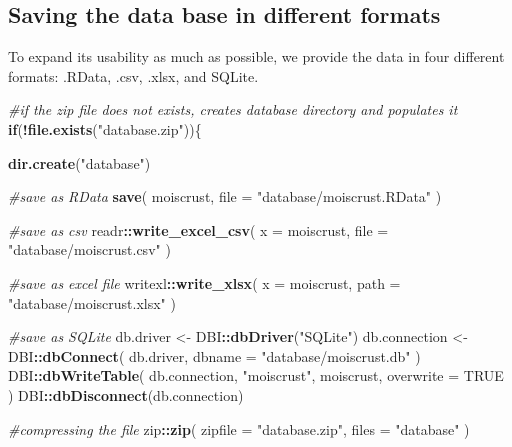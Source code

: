 \documentclass[]{article}
\newenvironment{Shaded}{\begin{snugshade}}{\end{snugshade}}
\newcommand{\CommentTok}[1]{\textcolor[rgb]{0.56,0.35,0.01}{\textit{#1}}}
\newcommand{\ControlFlowTok}[1]{\textcolor[rgb]{0.13,0.29,0.53}{\textbf{#1}}}
\newcommand{\DataTypeTok}[1]{\textcolor[rgb]{0.13,0.29,0.53}{#1}}
\newcommand{\KeywordTok}[1]{\textcolor[rgb]{0.13,0.29,0.53}{\textbf{#1}}}
\newcommand{\NormalTok}[1]{#1}
\newcommand{\OperatorTok}[1]{\textcolor[rgb]{0.81,0.36,0.00}{\textbf{#1}}}
\newcommand{\OtherTok}[1]{\textcolor[rgb]{0.56,0.35,0.01}{#1}}
\newcommand{\StringTok}[1]{\textcolor[rgb]{0.31,0.60,0.02}{#1}}
\begin{document}
\hypertarget{saving-the-data-base-in-different-formats}{%
\subsection{Saving the data base in different
formats}\label{saving-the-data-base-in-different-formats}}

To expand its usability as much as possible, we provide the data in four
different formats: .RData, .csv, .xlsx, and SQLite.

\begin{Shaded}
\begin{Highlighting}[]
\CommentTok{#if the zip file does not exists, creates database directory and populates it}
\ControlFlowTok{if}\NormalTok{(}\OperatorTok{!}\KeywordTok{file.exists}\NormalTok{(}\StringTok{"database.zip"}\NormalTok{))\{}
  
  \KeywordTok{dir.create}\NormalTok{(}\StringTok{"database"}\NormalTok{)}
  
  \CommentTok{#save as RData}
  \KeywordTok{save}\NormalTok{(}
\NormalTok{    moiscrust, }
    \DataTypeTok{file =} \StringTok{"database/moiscrust.RData"}
\NormalTok{  )}
  
  \CommentTok{#save as csv}
\NormalTok{  readr}\OperatorTok{::}\KeywordTok{write_excel_csv}\NormalTok{(}
    \DataTypeTok{x =}\NormalTok{ moiscrust,}
    \DataTypeTok{file =} \StringTok{"database/moiscrust.csv"}
\NormalTok{  )}
  
  \CommentTok{#save as excel file}
\NormalTok{  writexl}\OperatorTok{::}\KeywordTok{write_xlsx}\NormalTok{(}
    \DataTypeTok{x =}\NormalTok{ moiscrust,}
    \DataTypeTok{path =} \StringTok{"database/moiscrust.xlsx"}
\NormalTok{  )}
  
  \CommentTok{#save as SQLite}
\NormalTok{  db.driver <-}\StringTok{ }\NormalTok{DBI}\OperatorTok{::}\KeywordTok{dbDriver}\NormalTok{(}\StringTok{"SQLite"}\NormalTok{)}
\NormalTok{  db.connection <-}\StringTok{  }\NormalTok{DBI}\OperatorTok{::}\KeywordTok{dbConnect}\NormalTok{(}
\NormalTok{    db.driver, }
    \DataTypeTok{dbname =} \StringTok{"database/moiscrust.db"}
\NormalTok{    )}
\NormalTok{  DBI}\OperatorTok{::}\KeywordTok{dbWriteTable}\NormalTok{(}
\NormalTok{    db.connection, }
    \StringTok{"moiscrust"}\NormalTok{, }
\NormalTok{    moiscrust, }
    \DataTypeTok{overwrite =} \OtherTok{TRUE}
\NormalTok{    )}
\NormalTok{  DBI}\OperatorTok{::}\KeywordTok{dbDisconnect}\NormalTok{(db.connection)}
  
  \CommentTok{#compressing the file}
\NormalTok{  zip}\OperatorTok{::}\KeywordTok{zip}\NormalTok{(}
    \DataTypeTok{zipfile =} \StringTok{"database.zip"}\NormalTok{,}
    \DataTypeTok{files =} \StringTok{"database"}
\NormalTok{  )}
  

\end{Highlighting}
\end{Shaded}
\end{document}
